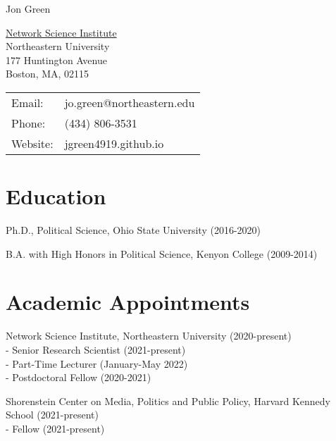 \documentclass[letterpaper]{article}
\def\name{Jon Green}
\renewenvironment{itemize}{
  \begin{list}{}{
    \setlength{\leftmargin}{1.5em}
  }
}{
  \end{list}
}
\begin{document}
{\huge \name}


\vspace{0.25in}

\begin{minipage}{0.45\linewidth}
  \href{https://www.lazerlab.net/}{Network Science Institute} \\
    Northeastern University \\
    177 Huntington Avenue \\
  Boston, MA, 02115
\end{minipage}
\begin{minipage}{0.45\linewidth}
  \begin{tabular}{ll}
    Email: & jo.green@northeastern.edu \\
    Phone: & (434) 806-3531 \\
    Website: & jgreen4919.github.io \\
  \end{tabular}
\end{minipage}

\section*{Education}

\begin{itemize}
    \item Ph.D., Political Science, Ohio State University (2016-2020)
	\item B.A. with High Honors in Political Science, Kenyon College (2009-2014)
\end{itemize}

\section*{Academic Appointments}

\begin{itemize}

\item Network Science Institute, Northeastern University (2020-present)\\
- Senior Research Scientist (2021-present)\\
- Part-Time Lecturer (January-May 2022)\\
- Postdoctoral Fellow (2020-2021)

\item Shorenstein Center on Media, Politics and Public Policy, Harvard Kennedy School (2021-present)\\
- Fellow (2021-present)
\end{itemize}
\end{document}
